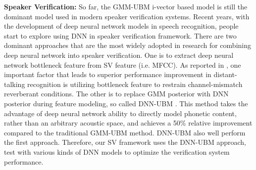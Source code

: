 \noindent \textbf{Speaker Verification:} So far, the GMM-UBM i-vector based model \cite{dehak2011front} is still the dominant model used in modern speaker verification systems. Recent years, with the development of deep neural network models in speech recognition, people start to explore using DNN in speaker verification framework. There are two dominant approaches that are the most widely adopted in research for combining deep neural network into speaker verification. One is to extract deep neural network bottleneck feature from SV feature (i.e. MFCC). As reported in \cite{yamada2013improvement}, one important factor that leads to superior performance improvement in distant-talking recognition is utilizing bottleneck feature to restrain channel-mismatch reverberant conditions. The other is to replace GMM posterior with DNN posterior during feature modeling, so called DNN-UBM \cite{Snyder2016Time, mclaren2015advances}. This method takes the advantage of deep neural network ability to directly model phonetic content, rather than an arbitrary acoustic space, and achieves a 50\% relative improvement compared to the traditional GMM-UBM method. DNN-UBM also well perform the first approach. Therefore, our SV framework uses the DNN-UBM approach, test with various kinds of DNN models to optimize the verification system performance.
